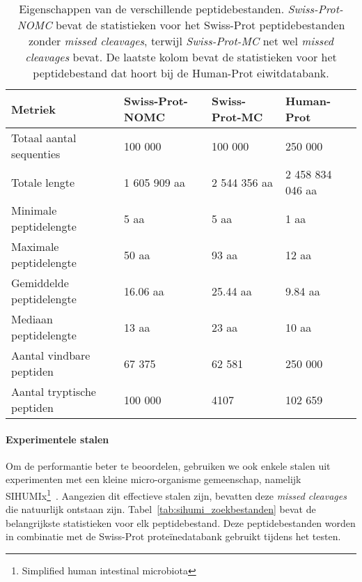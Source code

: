 \begin{table}[H]
    \centering
    \begin{tabular}{l l l l}
        Metriek                    & Swiss-Prot-NOMC & Swiss-Prot-MC & Human-Prot       \\
        \hline\hline
        Totaal aantal sequenties   & 100 000         & 100 000       & 250 000          \\
        Totale lengte              & 1 605 909 aa    & 2 544 356 aa  & 2 458 834 046 aa \\
        Minimale peptidelengte     & 5 aa            & 5 aa          & 1 aa             \\
        Maximale peptidelengte     & 50 aa           & 93 aa         & 12 aa            \\
        Gemiddelde peptidelengte   & 16.06 aa        & 25.44 aa      & 9.84 aa          \\
        Mediaan peptidelengte      & 13 aa           & 23 aa         & 10 aa            \\
        Aantal vindbare peptiden   & 67 375          & 62 581        & 250 000          \\
        Aantal tryptische peptiden & 100 000         & 4107          & 102 659          \\
        \hline
    \end{tabular}
    \caption{Eigenschappen van de verschillende peptidebestanden. \textit{Swiss-Prot-NOMC} bevat de statistieken voor het Swiss-Prot peptidebestanden zonder \textit{missed cleavages}, terwijl \textit{Swiss-Prot-MC} net wel \textit{missed cleavages} bevat. De laatste kolom bevat de statistieken voor het peptidebestand dat hoort bij de Human-Prot eiwitdatabank.}
    \label{tab:artifiele_bestanden_statistieken}
\end{table}

\paragraph{Experimentele stalen}
Om de performantie beter te beoordelen, gebruiken we ook enkele stalen uit experimenten met een kleine micro-organisme gemeenschap, namelijk SIHUMIx\footnote{Simplified human intestinal microbiota}~\cite{SIHUMI_first_introduction, SIHUMI_frequently_used}.
Aangezien dit effectieve stalen zijn, bevatten deze \textit{missed cleavages} die natuurlijk ontstaan zijn.
Tabel~\ref{tab:sihumi_zoekbestanden} bevat de belangrijkste statistieken voor elk peptidebestand.
Deze peptidebestanden worden in combinatie met de Swiss-Prot proteïnedatabank gebruikt tijdens het testen.

